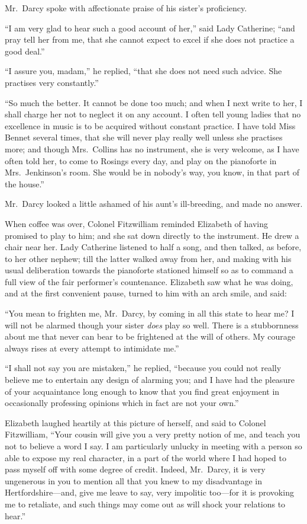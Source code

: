 Mr.\ Darcy spoke with affectionate praise of his sister's
proficiency.

``I am very glad to hear such a good account of her,'' said Lady
Catherine; ``and pray tell her from me, that she cannot expect to
excel if she does not practice a good deal.''

``I assure you, madam,'' he replied, ``that she does not need such
advice.  She practises very constantly.''

``So much the better.  It cannot be done too much; and when I
next write to her, I shall charge her not to neglect it on any
account.  I often tell young ladies that no excellence in music
is to be acquired without constant practice.  I have told Miss
Bennet several times, that she will never play really well unless
she practises more; and though Mrs.\ Collins has no instrument,
she is very welcome, as I have often told her, to come to Rosings
every day, and play on the pianoforte in Mrs.\ Jenkinson's room.
She would be in nobody's way, you know, in that part of the house.''

Mr.\ Darcy looked a little ashamed of his aunt's ill-breeding, and
made no answer.

When coffee was over, Colonel Fitzwilliam reminded Elizabeth
of having promised to play to him; and she sat down directly to
the instrument.  He drew a chair near her.  Lady Catherine
listened to half a song, and then talked, as before, to her other
nephew; till the latter walked away from her, and making with
his usual deliberation towards the pianoforte stationed himself
so as to command a full view of the fair performer's countenance.
Elizabeth saw what he was doing, and at the first convenient
pause, turned to him with an arch smile, and said:

``You mean to frighten me, Mr.\ Darcy, by coming in all this state
to hear me?  I will not be alarmed though your sister \emph{does} play
so well.  There is a stubbornness about me that never can bear to
be frightened at the will of others.  My courage always rises at
every attempt to intimidate me.''

``I shall not say you are mistaken,'' he replied, ``because you
could not really believe me to entertain any design of alarming
you; and I have had the pleasure of your acquaintance long
enough to know that you find great enjoyment in occasionally
professing opinions which in fact are not your own.''

Elizabeth laughed heartily at this picture of herself, and said to
Colonel Fitzwilliam, ``Your cousin will give you a very pretty
notion of me, and teach you not to believe a word I say.  I am
particularly unlucky in meeting with a person so able to expose
my real character, in a part of the world where I had hoped to
pass myself off with some degree of credit.  Indeed, Mr.\ Darcy,
it is very ungenerous in you to mention all that you knew to my
disadvantage in Hertfordshire---and, give me leave to say, very
impolitic too---for it is provoking me to retaliate, and such
things may come out as will shock your relations to hear.''

